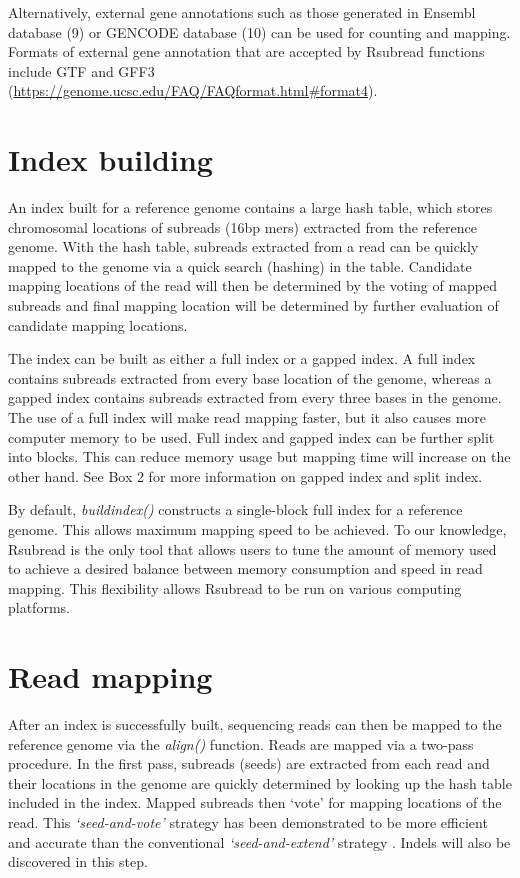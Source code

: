 \documentclass[]{book}
\begin{document}
Alternatively, external gene annotations such as those generated in Ensembl database (9) or
GENCODE database (10) can be used for counting and mapping. Formats of external gene annotation that are accepted by Rsubread functions include GTF and GFF3 (\url{https://genome.ucsc.edu/FAQ/FAQformat.html\#format4}).

\hypertarget{index-building}{%
\section{Index building}\label{index-building}}

An index built for a reference genome contains a large hash table, which stores chromosomal
locations of subreads (16bp mers) extracted from the reference genome. With the hash table,
subreads extracted from a read can be quickly mapped to the genome via a quick search (hashing)
in the table. Candidate mapping locations of the read will then be determined by the voting of
mapped subreads and final mapping location will be determined by further evaluation of candidate
mapping locations.

The index can be built as either a full index or a gapped index. A full index contains subreads
extracted from every base location of the genome, whereas a gapped index contains subreads
extracted from every three bases in the genome. The use of a full index will make read mapping
faster, but it also causes more computer memory to be used. Full index and gapped index can be
further split into blocks. This can reduce memory usage but mapping time will increase on the
other hand. See Box 2 for more information on gapped index and split index.

By default, \emph{buildindex()} constructs a single-block full index for a reference genome. This
allows maximum mapping speed to be achieved. To our knowledge, Rsubread is the only tool that
allows users to tune the amount of memory used to achieve a desired balance between memory
consumption and speed in read mapping. This flexibility allows Rsubread to be run on various
computing platforms.

\hypertarget{read-mapping}{%
\section{Read mapping}\label{read-mapping}}

After an index is successfully built, sequencing reads can then be mapped to the reference genome
via the \emph{align()} function. Reads are mapped via a two-pass procedure. In the first pass, subreads (seeds) are extracted from each read and their locations in the genome are quickly determined by looking up the hash table included in the index. Mapped subreads then `vote' for mapping locations of the read. This \emph{`seed-and-vote'} strategy has been demonstrated to be more efficient and accurate than the conventional \emph{`seed-and-extend'} strategy \citep{Rsubread2019, liao2013subread}. Indels will also be discovered in this step.
\end{document}
